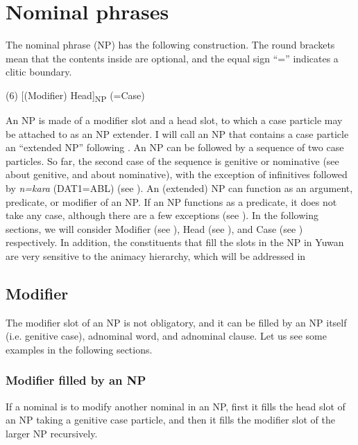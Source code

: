 \chapter{Nominal phrases}\label{chap:6}

The nominal phrase (NP) has the following construction. The round brackets mean that the contents inside are optional, and the equal sign “=” indicates a clitic boundary.

(6) [(Modifier) Head]\textsubscript{NP} (=Case)

An NP is made of a modifier slot and a head slot, to which a case particle may be attached to as an NP extender. I will call an NP that contains a case particle an “extended NP” following \citet[167]{Shimoji2008}. An NP can be followed by a sequence of two case particles. So far, the second case of the sequence is genitive or nominative (see  about genitive, and  about nominative), with the exception of infinitives followed by \textit{n=kara} (DAT1=ABL) (see ). An (extended) NP can function as an argument, predicate, or modifier of an NP. If an NP functions as a predicate, it does not take any case, although there are a few exceptions (see ). In the following sections, we will consider Modifier (see ), Head (see ), and Case (see ) respectively. In addition, the constituents that fill the slots in the NP in Yuwan are very sensitive to the animacy hierarchy, which will be addressed in 

\section{Modifier}

The modifier slot of an NP is not obligatory, and it can be filled by an NP itself (i.e. genitive case), adnominal word, and adnominal clause. Let us see some examples in the following sections.

\subsection{Modifier filled by an NP}

If a nominal is to modify another nominal in an NP, first it fills the head slot of an NP taking a genitive case particle, and then it fills the modifier slot of the larger NP recursively.


